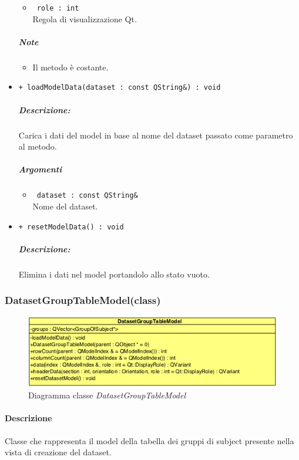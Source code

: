 \begin{itemize}
\begin{itemize}
			\item \color{RoyalPurple}\verb! role : int!\\
			\color{black}Regola di visualizzazione Qt\g{}.
		\end{itemize}
	\subparagraph{Note}
			\begin{itemize}
				\item Il metodo è costante.
			\end{itemize}
		
	\item \color{blue}\verb!+ loadModelData(dataset : const QString&) : void!\\
		\color{black}
		\subparagraph{Descrizione:} Carica i dati del model in base al nome del dataset\g{} passato come parametro al metodo.\\
		\subparagraph{Argomenti}
			\begin{itemize}				
				\item \color{RoyalPurple}\verb! dataset : const QString&!\\
				\color{black} Nome del dataset\g{}.
			\end{itemize}
			
	\item \color{blue}\verb!+ resetModelData() : void!\\
			\color{black}
			\subparagraph{Descrizione:} Elimina i dati nel model portandolo allo stato vuoto.\\
\end{itemize}
\pagebreak


\subsubsection{DatasetGroupTableModel(class)}
\label{DatasetGroupTableModel}
\begin{figure}[!h]
	\centering
	\includegraphics[width=0.6\linewidth]{./Content/Immagini/QtModel/DatasetGroupTableModel.png}
	\caption{Diagramma classe \textsl{DatasetGroupTableModel}}
	\label{comp_DatasetGroupTableModel}
\end{figure}

\paragraph{Descrizione\\} 
Classe che rappresenta il model della tabella dei gruppi di subject\g{} presente nella vista di creazione del dataset\g{}.

